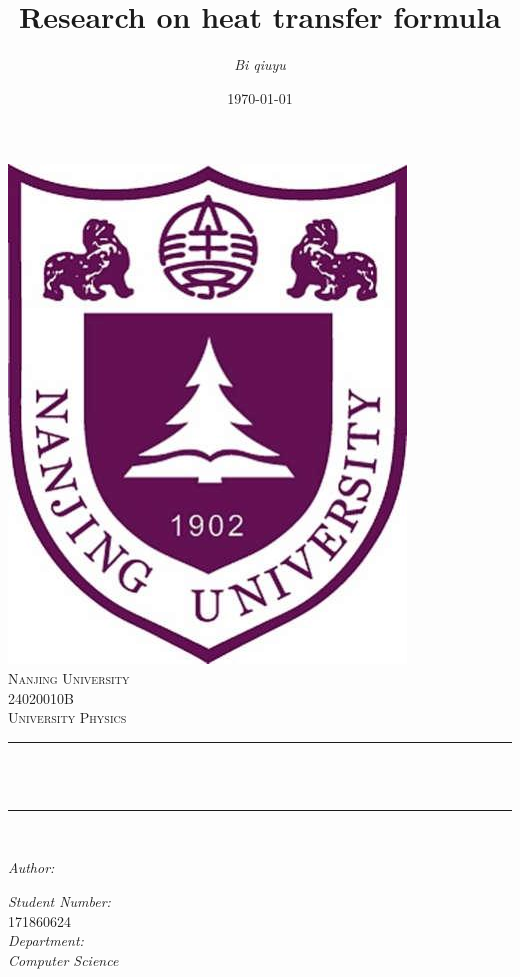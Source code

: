 \documentclass[12pt]{ctexart}
\title{Research on heat transfer formula}								%
\author{\emph{Bi qiuyu}}								%
\date{\today}											%
\makeatletter
\let\thetitle\@title
\let\theauthor\@author
\makeatother
\begin{document}

\begin{titlepage}
	\centering
    \vspace*{0.5 cm}
    \includegraphics[scale = 0.2]{NJU.jpg}\\[1.0 cm]	%
    \textsc{\LARGE Nanjing University}\\[2.0 cm]	%
    \textsc{\large 24020010B}\\[0.5 cm]				%
	\textsc{\large University Physics \uppercase\expandafter{}}\\[0.5 cm]				%
	\rule{\linewidth}{0.2 mm} \\[0.4 cm]
    {\huge \bfseries \thetitle}\\
	\rule{\linewidth}{0.2 mm} \\[1.5 cm]
	
	\begin{minipage}{0.4\textwidth}
		\begin{flushleft} \large
			\emph{Author:}\\
			\theauthor
			\end{flushleft}
			\end{minipage}
			\begin{minipage}{0.4\textwidth}
			\begin{flushright} \large
                \emph{Student Number:} \\
			171860624\\									%
                \emph{Department:} \\
                \emph{Computer Science}
		\end{flushright}
	\end{minipage}\\[2 cm]
	

\end{titlepage}
\end{document}
